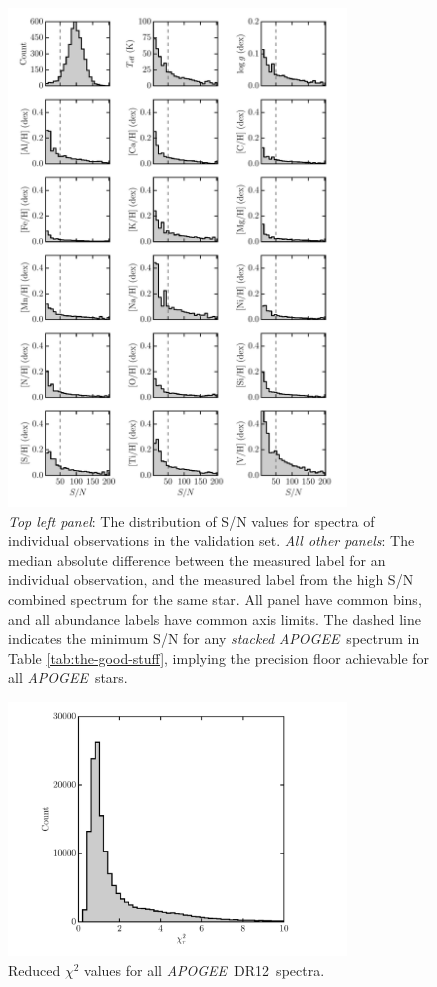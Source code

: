 \documentclass[12pt,preprint]{aastex}
\newcommand{\project}[1]{\textsl{#1}}
\newcommand{\acronym}[1]{{\small{#1}}}
\newcommand{\apogee}{\project{\acronym{APOGEE}}}
\newcommand{\dr}{\acronym{DR12}}
\begin{document}
\begin{figure}[p]
\centering
\includegraphics[width=0.8\textwidth]{validation-label-recovery.pdf}
\caption{\emph{Top left panel}: The distribution of S/N values for spectra of individual observations in the validation set. \emph{All other panels}: The median absolute difference between the measured label for an individual observation, and the measured label from the high S/N combined spectrum for the same star.  All panel have common bins, and all abundance labels have common axis limits.  The dashed line indicates the minimum S/N for any \emph{stacked} \apogee\ spectrum in Table \ref{tab:the-good-stuff}, implying the precision floor achievable for all \apogee\ stars.\label{fig:label-recovery-snr}}
\end{figure}

\clearpage

\begin{figure}[p]
\centering
\includegraphics[width=0.8\textwidth]{test-step-chisq.pdf}
\caption{Reduced $\chi^2$ values for all \apogee\ \dr\ spectra.\label{fig:chisq-test-set}}
\end{figure}
\end{document}
